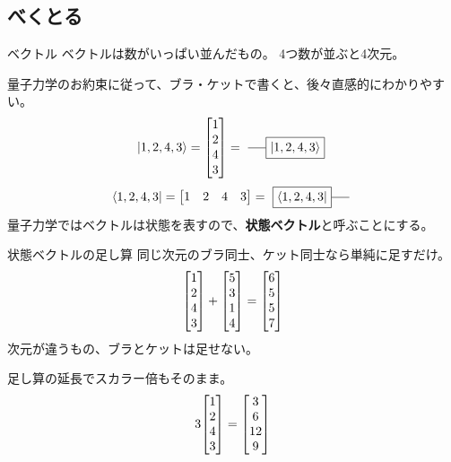 \documentclass[dvipdfm]{beamer}
\begin{document}
\subsection{べくとる}

\begin{frame}{ベクトル}
    ベクトルは数がいっぱい並んだもの。
    4つ数が並ぶと4次元。

    量子力学のお約束に従って、ブラ・ケットで書くと、後々直感的にわかりやすい。
    \begin{equation*}
        \ket{1,2,4,3}
        =
        \mqty[1\\2\\4\\3]
        =
        \vcenter{\hbox{
            \begin{tikzpicture}
                \node at(0,0)[draw,rectangle](ket){$\ket{1,2,4,3}$};
                \draw(ket.west)--++(-.5,0);
            \end{tikzpicture}
        }}
    \end{equation*}
    \begin{equation*}
        \bra{1,2,4,3}
        =
        \mqty[1&2&4&3]
        =
        \vcenter{\hbox{
            \begin{tikzpicture}
                \node at(0,0)[draw,rectangle](ket){$\bra{1,2,4,3}$};
                \draw(ket.east)--++(.5,0);
            \end{tikzpicture}
        }}
    \end{equation*}
    量子力学ではベクトルは状態を表すので、\alert{\textbf{状態ベクトル}}と呼ぶことにする。
\end{frame}

\begin{frame}{状態ベクトルの足し算}
    同じ次元のブラ同士、ケット同士なら単純に足すだけ。
    \begin{equation*}
        \mqty[1\\2\\4\\3]
        +
        \mqty[5\\3\\1\\4]
        =
        \mqty[6\\5\\5\\7]
    \end{equation*}
    次元が違うもの、ブラとケットは足せない。

    足し算の延長でスカラー倍もそのまま。
    \begin{equation*}
        3\mqty[1\\2\\4\\3]
        =
        \mqty[3\\6\\12\\9]
    \end{equation*}
\end{frame}
\end{document}
